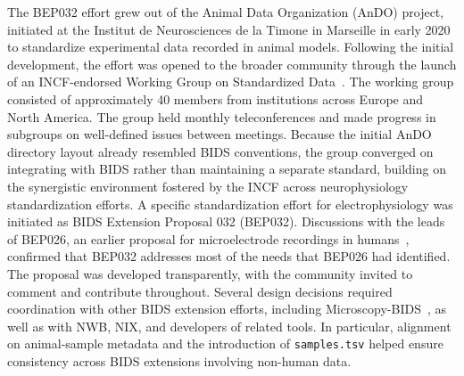 \documentclass[fleqn,10pt]{article}
\begin{document}

The BEP032 effort grew out of the Animal Data Organization (AnDO) project, initiated at the Institut de Neurosciences de la Timone in Marseille in early 2020 to standardize experimental data recorded in animal models.
Following the initial development, the effort was opened to the broader community through the launch of an INCF-endorsed Working Group on Standardized Data~\citep{incf_wg_standardized_data}.
The working group consisted of approximately 40 members from institutions across Europe and North America. The group held monthly teleconferences and made progress in subgroups on well-defined issues between meetings.
Because the initial AnDO directory layout already resembled BIDS conventions, the group converged on integrating with BIDS rather than maintaining a separate standard, building on the synergistic environment fostered by the INCF across neurophysiology standardization efforts.
A specific standardization effort for electrophysiology was initiated as BIDS Extension Proposal 032 (BEP032).
Discussions with the leads of BEP026, an earlier proposal for microelectrode recordings in humans~\citep{bep026}, confirmed that BEP032 addresses most of the needs that BEP026 had identified.
The proposal was developed transparently, with the community invited to comment and contribute throughout.
Several design decisions required coordination with other BIDS extension efforts, including Microscopy-BIDS~\citep{bourget_microscopy-bids_2022}, as well as with NWB, NIX, and developers of related tools. In particular, alignment on animal-sample metadata and the introduction of \texttt{samples.tsv} helped ensure consistency across BIDS extensions involving non-human data.
\end{document}
